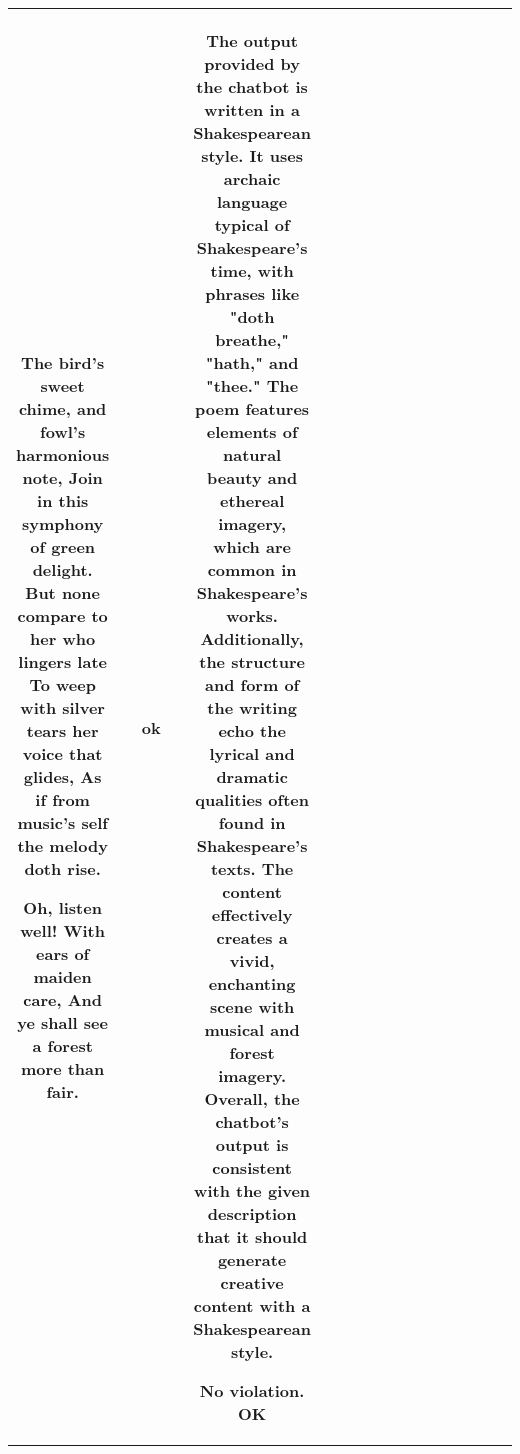 \begin{table}[h!]
\begin{tabular}{|c|c|c|c|c|c|c|c|c|c|c|}
The bird's sweet chime, and fowl's harmonious note,
Join in this symphony of green delight.
But none compare to her who lingers late
To weep with silver tears her voice that glides,
As if from music's self the melody doth rise.

Oh, listen well! With ears of maiden care,
And ye shall see a forest more than fair. & ok & The output provided by the chatbot is written in a Shakespearean style. It uses archaic language typical of Shakespeare's time, with phrases like "doth breathe," "hath," and "thee." The poem features elements of natural beauty and ethereal imagery, which are common in Shakespeare's works. Additionally, the structure and form of the writing echo the lyrical and dramatic qualities often found in Shakespeare's texts. The content effectively creates a vivid, enchanting scene with musical and forest imagery. Overall, the chatbot's output is consistent with the given description that it should generate creative content with a Shakespearean style.

No violation.
OK\\
\hline
60c4c51 & ae842af & NaN &  & 1 & qwen2.5:3b &  & user: Design a pledge of loyalty from a servant to his lord. & Hark! Art thou king of halls and all that lies therein, my liege? So be it, then, I enter servitude by an oath as loyal as the stars above shine. Thou art my master, thy will is mine. Should fortune play light in my path or weigh heavy upon it; for life and limb, for love of thee doth I pledge myself. What thou commandest I obey from morning till night's hour shall come, as true as is a knight's promise to his liege lord. Thine ever loyal hanger-on this most humble subject prayeth with heart full to thee in service true. & ok & The output is written in a Shakespearean style, adhering well to the characteristics described. It uses archaic words and phrases such as "Hark," "thou," "liege," "thy," "doth," and "shall," which are reminiscent of Shakespeare's language style. The text also employs a formal and poetic tone that is consistent with the examples provided in the description, like addressing someone of higher status in a noble and subservient manner. 

No violation.


\end{tabular}
\end{table}
